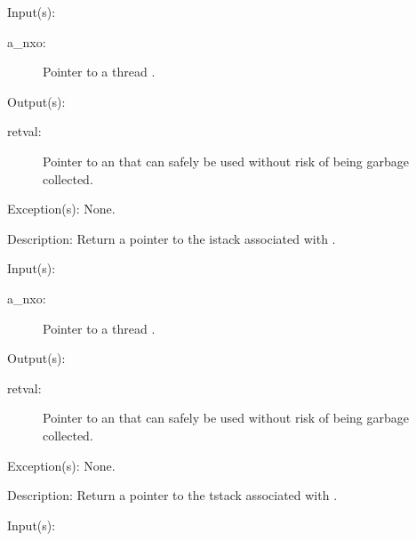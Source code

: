 \begin{capi}
	\begin{capilist}
	\item[Input(s): ]
		\begin{description}\item[]
		\item[a\_nxo: ]
			Pointer to a thread .
		\end{description}
	\item[Output(s): ]
		\begin{description}\item[]
		\item[retval: ]
			Pointer to an  that can safely be used
			without risk of being garbage collected.
		\end{description}
	\item[Exception(s): ] None.
	\item[Description: ]
		Return a pointer to the istack associated with .
	\end{capilist}
\label{nxo_thread_tstack_get}
	\begin{capilist}
	\item[Input(s): ]
		\begin{description}\item[]
		\item[a\_nxo: ]
			Pointer to a thread \classname{nxo}.
		\end{description}
	\item[Output(s): ]
		\begin{description}\item[]
		\item[retval: ]
			Pointer to an  that can safely be used
			without risk of being garbage collected.
		\end{description}
	\item[Exception(s): ] None.
	\item[Description: ]
		Return a pointer to the tstack associated with \cvar{a\_nxo}.
	\end{capilist}
\label{nxo_thread_stdin_get}
	\begin{capilist}
	\item[Input(s): ]
		\begin{description}\item[]

\end{description}
\end{capilist}
\end{capi}
